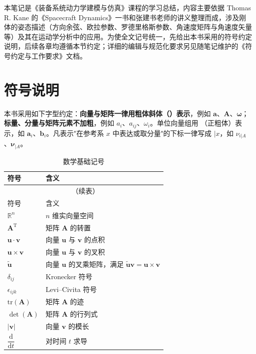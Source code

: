 本笔记是《装备系统动力学建模与仿真》课程的学习总结，内容主要依据 Thomas R. Kane 的《Spacecraft Dynamics》一书和张建书老师的讲义整理而成，涉及刚体的姿态描述（方向余弦、欧拉参数、罗德里格斯参数、角速度矩阵与角速度矢量等）及其在运动学分析中的应用。为使全文记号统一，先给出本书采用的符号约定说明，后续各章均遵循本节约定；详细的编辑与规范化要求另见随笔记维护的《符号约定与工作要求》文档。

\section{符号说明}
\label{sec:符号说明}

本书采用如下字型约定：\textbf{向量与矩阵一律用粗体斜体（$\bm{}$）表示}，例如 $\bm{a}$、$\bm{A}$、$\bm{\omega}$；\textbf{标量、分量与矩阵元素不加粗}，例如 $a_i$、$a_{ij}$、$\omega_i$。单位向量组用 $\mathbf{}$（正粗体）表示，如 $\mathbf{a}_i$、$\mathbf{b}_i$。凡表示"在参考系 $x$ 中表达或取分量"的下标一律写成 $|x$，如 $\nu_{i|A}$、$\bm{\nu}_{|A}$。


\begin{longtable}{ll}
\caption{数学基础记号}\label{tab:符号说明:数学记号}\\
\toprule
符号 & 含义 \\
\midrule
\endfirsthead
\multicolumn{2}{c}{\tablename~\thetable{}（续表）}\\
\toprule
符号 & 含义 \\
\midrule
\endhead
$\mathbb{R}^{n}$ & $n$ 维实向量空间 \\
$\bm{A}^{\mathrm{T}}$ & 矩阵 $\bm{A}$ 的转置 \\
$\bm{u}\cdot\bm{v}$ & 向量 $\bm{u}$ 与 $\bm{v}$ 的点积 \\
$\bm{u}\times\bm{v}$ & 向量 $\bm{u}$ 与 $\bm{v}$ 的叉积 \\
$\tilde{\bm{u}}$ & 向量 $\bm{u}$ 的叉乘矩阵，满足 $\tilde{\bm{u}}\bm{v}=\bm{u}\times\bm{v}$ \\
$\delta_{ij}$ & Kronecker 符号 \\
$\epsilon_{ijk}$ & Levi--Civita 符号 \\
$\mathrm{tr}(\bm{A})$ & 矩阵 $\bm{A}$ 的迹 \\
$\det(\bm{A})$ & 矩阵 $\bm{A}$ 的行列式 \\
$\left|\bm{v}\right|$ & 向量 $\bm{v}$ 的模长 \\
$\dfrac{\mathrm{d}}{\mathrm{d}t}$ & 对时间 $t$ 求导 \\
\bottomrule
\end{longtable}


